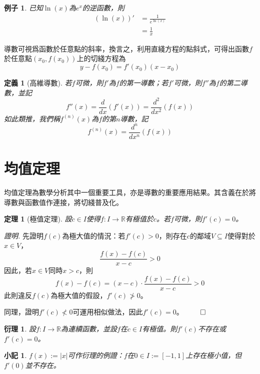 \documentclass[12pt]{article}
\newtheorem{definition}{定義}
\newtheorem*{theorem}{定理}
\newtheorem*{corollary}{衍理}
\newtheorem*{remark}{小記}
\newtheorem*{example}{例子}
\renewenvironment*{proof}{\textit{證明.}}{\hfill$\qed$}
\begin{document}
    \begin{example}
        已知$\ln(x)$為$e^x$的逆函數，則\begin{align*}
            (\ln(x))'&=\frac{1}{e^{\ln(x)}}\\
            &=\frac{1}{x}
        \end{align*}
    \end{example}

    導數可視爲函數於任意點的斜率，換言之，利用直綫方程的點斜式，可得出函數$f$於任意點$(x_0,f(x_0))$上的切綫方程為$$y-f(x_0)=f'(x_0)(x-x_0)$$

    \begin{definition}[高維導數]
        若$f$可微，則$f'$為$f$的第一導數；若$f'$可微，則$f''$為$f$的第二導數，並記$$f''(x)=\dfrac{d}{dx}(f'(x))=\dfrac{d^2}{dx^2}(f(x))$$如此類推，我們稱$f^{(n)}(x)$為$f$的第$n$導數，記$$f^{(n)}(x)=\dfrac{d^n}{dx^n}(f(x))$$
    \end{definition}

    \section*{均值定理}

    均值定理為數學分析其中一個重要工具，亦是導數的重要應用結果。其含義在於將導數與函數值作連接，將切綫普及化。

    \begin{theorem}[極值定理]
        設$c\in I$使得$f:I\to \mathbb{R}$有極值於$c$。若$f$可微，則$f'(c)=0$。
    \end{theorem}

    \begin{proof}
        先證明$f(c)$為極大值的情況：若$f'(c)>0$，則存在$c$的鄰域$V\subseteq I$使得對於$x\in V$，$$\frac{f(x)-f(c)}{x-c}>0$$因此，若$x\in V$同時$x>c$，則$$f(x)-f(c)=(x-c)\cdot\frac{f(x)-f(c)}{x-c}>0$$此則違反$f(c)$為極大值的假設，$f'(c)\not > 0$。

        同理，證明$f'(c)\not < 0$可運用相似做法，因此$f'(c)=0$。
    \end{proof}

    \begin{corollary}
        設$f:I\to\mathbb{R}$為連續函數，並設$f$在$c\in I$有極值。則$f'(c)$不存在或$f'(c)=0$。
    \end{corollary}

    \begin{remark}
        $f(x):=|x|$可作衍理的例證：$f$在$0\in I:=[-1,1]$上存在極小值，但$f'(0)$並不存在。
    \end{remark}
\end{document}
